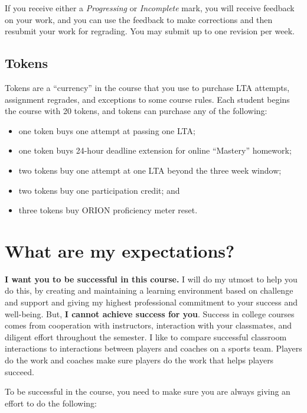 If you receive either a \emph{Progressing} or \emph{Incomplete} mark,
you will receive feedback on your work, and you can use the feedback to
make corrections and then resubmit your work for regrading. You may
submit up to one revision per week.

\hypertarget{tokens}{%
\subsection{Tokens}\label{tokens}}

Tokens are a ``currency'' in the course that you use to purchase LTA
attempts, assignment regrades, and exceptions to some course rules. Each
student begins the course with 20 tokens, and tokens can purchase any of
the following:

\begin{itemize}
\tightlist
\item
  one token buys one attempt at passing one LTA;
\item
  one token buys 24-hour deadline extension for online ``Mastery''
  homework;
\item
  two tokens buy one attempt at one LTA beyond the three week window;
\item
  two tokens buy one participation credit; and
\item
  three tokens buy ORION proficiency meter reset.
\end{itemize}

\hypertarget{what-are-my-expectations}{%
\section{What are my expectations?}\label{what-are-my-expectations}}

\textbf{I want you to be successful in this course.} I will do my utmost
to help you do this, by creating and maintaining a learning environment
based on challenge and support and giving my highest professional
commitment to your success and well-being. But, \textbf{I cannot achieve
success for you}. Success in college courses comes from cooperation with
instructors, interaction with your classmates, and diligent effort
throughout the semester. I like to compare successful classroom
interactions to interactions between players and coaches on a sports
team. Players do the work and coaches make sure players do the work that
helps players succeed.

To be successful in the course, you need to make sure you are always
giving an effort to do the following:

